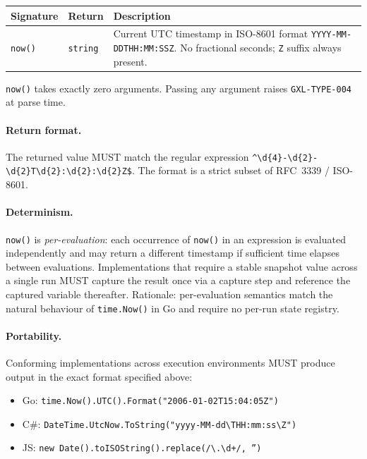 \begin{center}
\begin{tabular}{p{5.5cm}p{1.5cm}p{6cm}}
\hline
\textbf{Signature} & \textbf{Return} & \textbf{Description} \\
\hline
\texttt{now()} & \texttt{string}
  & Current UTC timestamp in ISO-8601 format
    \texttt{YYYY-MM-DDTHH:MM:SSZ}.
    No fractional seconds; \texttt{Z} suffix always present. \\
\hline
\end{tabular}
\end{center}

\texttt{now()} takes exactly zero arguments.
Passing any argument raises \texttt{GXL-TYPE-004} at parse time.

\paragraph{Return format.}
The returned value MUST match the regular expression
\texttt{\textasciicircum\textbackslash d\{4\}-\textbackslash d\{2\}-\textbackslash d\{2\}T\textbackslash d\{2\}:\textbackslash d\{2\}:\textbackslash d\{2\}Z\$}.
The format is a strict subset of RFC~3339 / ISO-8601.

\paragraph{Determinism.}
\texttt{now()} is \emph{per-evaluation}: each occurrence of \texttt{now()}
in an expression is evaluated independently and may return a different
timestamp if sufficient time elapses between evaluations.
Implementations that require a stable snapshot value across a single run
MUST capture the result once via a capture step and reference the captured
variable thereafter.
Rationale: per-evaluation semantics match the natural behaviour of
\texttt{time.Now()} in Go and require no per-run state registry.

\paragraph{Portability.}
Conforming implementations across execution environments MUST produce
output in the exact format specified above:

\begin{itemize}
  \item Go: \texttt{time.Now().UTC().Format("2006-01-02T15:04:05Z")}
  \item C\#: \texttt{DateTime.UtcNow.ToString("yyyy-MM-dd\textbackslash{}THH:mm:ss\textbackslash{}Z")}
  \item JS: \texttt{new Date().toISOString().replace(/\textbackslash.\textbackslash d+/, '')}
\end{itemize}

